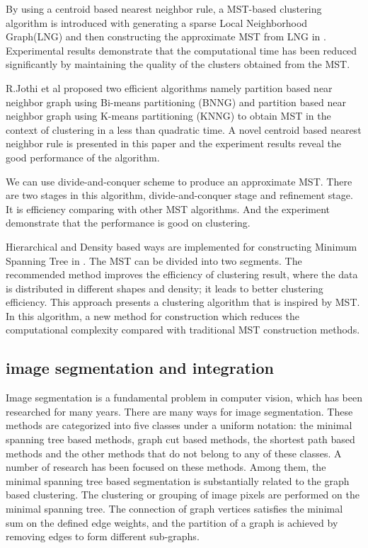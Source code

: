 	  By using a centroid based nearest neighbor rule, a MST-based clustering algorithm is introduced with generating a sparse Local Neighborhood Graph(LNG) and then constructing the approximate MST from LNG in \cite{Jothi2015Fast}. Experimental results demonstrate that the computational time has been reduced significantly by maintaining the quality of the clusters obtained from the MST. 

	  R.Jothi et al proposed two efficient algorithms namely partition based near neighbor graph using Bi-means partitioning (BNNG) and partition based near neighbor graph using K-means partitioning (KNNG) to obtain MST in the context of clustering in a less than quadratic time\cite{Jothi2017Fast}. A novel centroid based nearest neighbor rule is presented in this paper and the experiment results reveal the good performance of the algorithm. 

	  We can use divide-and-conquer scheme to produce an approximate MST\cite{fast_mst_zhong}. There are two stages in this algorithm, divide-and-conquer stage and refinement stage. It is efficiency comparing with other MST algorithms. And the experiment demonstrate that the performance is good on clustering. 

	  Hierarchical and Density based ways are implemented for constructing Minimum Spanning Tree in \cite{Pappula2017An}. The MST can be divided into two segments. The recommended method improves the efficiency of clustering result, where the data is distributed in different shapes and density; it leads to better clustering efficiency. This approach presents a clustering algorithm that is inspired by MST. In this algorithm, a new method for construction which reduces the computational complexity compared with traditional MST construction methods.

	\subsection{image segmentation and integration}
	  Image segmentation is a fundamental problem in computer vision, which has been researched for many years. There are many ways for image segmentation. These methods are categorized into five classes under a uniform notation: the minimal spanning tree based methods, graph cut based methods, the shortest path based methods and the other methods that do not belong to any of these classes\cite{PENG20131020}. A number of research has been focused on these methods. Among them, the minimal spanning tree based segmentation is substantially related to the graph based clustering\cite{7080012}. The clustering or grouping of image pixels are performed on the minimal spanning tree. The connection of graph vertices satisfies the minimal sum on the defined edge weights, and the partition of a graph is achieved by removing edges to form different sub-graphs. 
